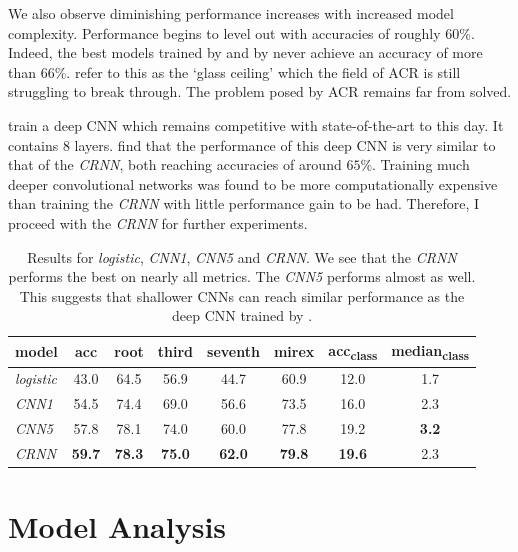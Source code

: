 We also observe diminishing performance increases with increased model complexity. Performance begins to level out with accuracies of roughly $60\%$. Indeed, the best models trained by \citet{BTC} and by \citet{ChordFormer} never achieve an accuracy of more than $66\%$. \citet{FourTimelyInsights} refer to this as the `glass ceiling' which the field of ACR is still struggling to break through. The problem posed by ACR remains far from solved.

\citet{FeatureMaps} train a deep CNN which remains competitive with state-of-the-art to this day. It contains 8 layers. \citet{BTC} find that the performance of this deep CNN is very similar to that of the \emph{CRNN}, both reaching accuracies of around $65\%$. Training much deeper convolutional networks was found to be more computationally expensive than training the \emph{CRNN} with little performance gain to be had. Therefore, I proceed with the \emph{CRNN} for further experiments.

\begin{table}[h]
    \centering
    \begin{tabular}{lccccccc}
        \toprule
        model & acc & root & third & seventh & mirex & acc\textsubscript{class} & median\textsubscript{class} \\  
        \midrule
        \emph{logistic} & 43.0 & 64.5 & 56.9 & 44.7 & 60.9 & 12.0 & 1.7 \\
        \emph{CNN1} & 54.5 & 74.4 & 69.0 & 56.6 & 73.5 & 16.0 & 2.3 \\
        \emph{CNN5} & 57.8 & 78.1 & 74.0 & 60.0 & 77.8 & 19.2 & \textbf{3.2} \\
        \emph{CRNN} & \textbf{59.7} & \textbf{78.3} & \textbf{75.0} & \textbf{62.0} & \textbf{79.8} & \textbf{19.6} & 2.3 \\
        \bottomrule
    \end{tabular}
    \caption{Results for \emph{logistic}, \emph{CNN1}, \emph{CNN5} and \emph{CRNN}. We see that the \emph{CRNN} performs the best on nearly all metrics. The \emph{CNN5} performs almost as well. This suggests that shallower CNNs can reach similar performance as the deep CNN trained by \citet{FeatureMaps}.}\label{tab:first_results}
\end{table}

\section{Model Analysis}\label{sec:crnn_analysis}


